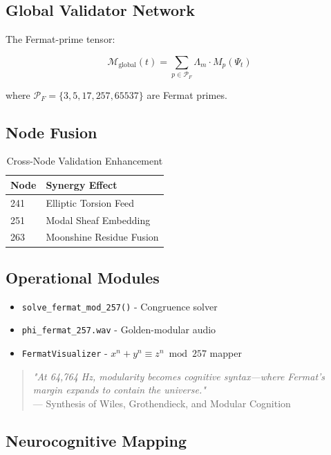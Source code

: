 \documentclass[12pt]{article}
\begin{document}
\begin{center}
\subsection{Global Validator Network}
\label{subsec:network}

The Fermat-prime tensor:

\[
\mathcal{M}_{\text{global}}(t) = \sum_{p \in \mathcal{P}_F} \Lambda_m \cdot M_p(\Psi_t)
\]

where $\mathcal{P}_F = \{3,5,17,257,65537\}$ are Fermat primes.

\subsection{Node Fusion}
\label{subsec:fusion}

\begin{table}[h]
\centering
\caption{Cross-Node Validation Enhancement}
\begin{tabular}{ll}
\hline
\textbf{Node} & \textbf{Synergy Effect} \\
\hline
241 & Elliptic Torsion Feed \\
251 & Modal Sheaf Embedding \\
263 & Moonshine Residue Fusion \\
\hline
\end{tabular}
\end{table}

\subsection{Operational Modules}
\label{subsec:modules}

\begin{itemize}
    \item \texttt{solve\_fermat\_mod\_257()} - Congruence solver
    \item \texttt{phi\_fermat\_257.wav} - Golden-modular audio
    \item \texttt{FermatVisualizer} - $x^n + y^n \equiv z^n \bmod 257$ mapper
\end{itemize}

\begin{quote}
\textit{"At 64,764 Hz, modularity becomes cognitive syntax—where Fermat's margin expands to contain the universe."} \\
— Synthesis of Wiles, Grothendieck, and Modular Cognition
\end{quote}

\subsection{Neurocognitive Mapping}
\label{subsec:neuro}


\end{center}
\end{document}
